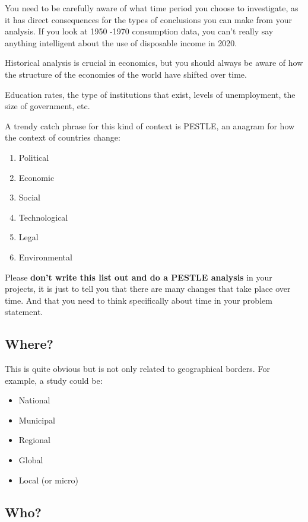 \documentclass[
]{book}
\begin{document}
You need to be carefully aware of what time period you choose to
investigate, as it has direct consequences for the types of conclusions
you can make from your analysis. If you look at 1950 -1970 consumption
data, you can't really say anything intelligent about the use of
disposable income in 2020.

Historical analysis is crucial in economics, but you should always be
aware of how the structure of the economies of the world have shifted
over time.

Education rates, the type of institutions that exist, levels of
unemployment, the size of government, etc.

A trendy catch phrase for this kind of context is PESTLE, an anagram for
how the context of countries change:

\begin{enumerate}
\def\labelenumi{\arabic{enumi}.}
\item
  Political
\item
  Economic
\item
  Social
\item
  Technological
\item
  Legal
\item
  Environmental
\end{enumerate}

Please \textbf{don't write this list out and do a PESTLE analysis} in your
projects, it is just to tell you that there are many changes that take
place over time. And that you need to think specifically about time in
your problem statement.

\hypertarget{where}{%
\subsection{Where?}\label{where}}

This is quite obvious but is not only related to geographical borders.
For example, a study could be:

\begin{itemize}
\item
  National
\item
  Municipal
\item
  Regional
\item
  Global
\item
  Local (or micro)
\end{itemize}

\hypertarget{who}{%
\subsection{Who?}\label{who}}
\end{document}
